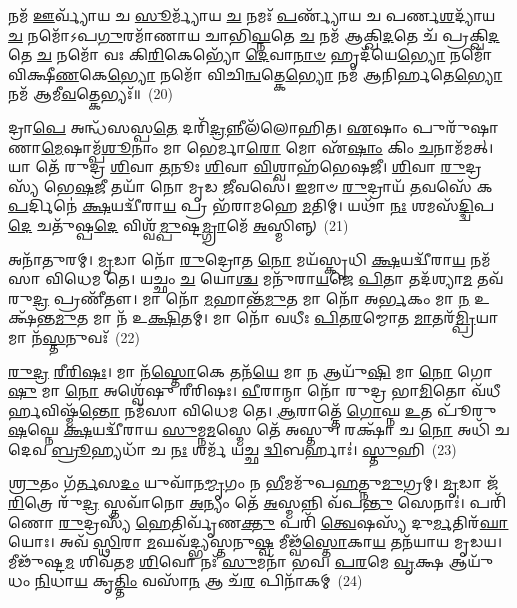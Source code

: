 𑌨𑌮᳴ \ul{𑌊}\-𑌰𑍍𑌵𑍍𑌯𑌾᳴𑌯 𑌚 \ul{𑌸𑍂}\-𑌰𑍍𑌮𑍍𑌯𑌾᳴𑌯 \ul{𑌚} 𑌨𑌮𑌃᳴ \ul{𑌪}\-𑌰𑍍𑌣𑍍𑌯𑌾᳴𑌯 𑌚 𑌪𑌰𑍍𑌣\-\ul{𑌶}\-𑌦𑍍𑌯𑌾᳴𑌯 \ul{𑌚} 𑌨𑌮𑍋᳴\-𑌽𑌪\-\ul{𑌗𑍁}\-𑌰𑌮𑌾᳴𑌣𑌾𑌯 𑌚𑌾𑌭𑌿\-\ul{𑌘𑍍𑌨}\-𑌤𑍇 \ul{𑌚} 𑌨𑌮᳴ 𑌆𑌕𑍍𑌖𑌿\-\ul{𑌦}\-𑌤𑍇 𑌚᳴ 𑌪𑍍𑌰𑌕𑍍𑌖𑌿\-\ul{𑌦}\-𑌤𑍇 \ul{𑌚} 𑌨𑌮𑍋᳴ 𑌵𑌃 𑌕𑌿\-\ul{𑌰𑌿}\-𑌕𑍇𑌭𑍍𑌯𑍋᳴ \ul{𑌦𑍇}\-𑌵𑌾\-\ul{𑌨𑌾}\-\-\ul{𑍞} 𑌹𑍃𑌦᳴𑌯𑍇\-\ul{𑌭𑍍𑌯𑍋} 𑌨𑌮𑍋᳴ 𑌵𑌿𑌕𑍍𑌷𑍀\-\ul{𑌣}\-𑌕𑍇\-\ul{𑌭𑍍𑌯𑍋} 𑌨𑌮𑍋᳴ 𑌵𑌿𑌚𑌿\-\ul{𑌨𑍍𑌵}\-𑌤𑍍𑌕𑍇\-\ul{𑌭𑍍𑌯𑍋} 𑌨𑌮᳴ 𑌆𑌨𑌿𑌰𑍍\mbox{}\-\ul{𑌹}\-𑌤𑍇\-\ul{𑌭𑍍𑌯𑍋} 𑌨𑌮᳴ 𑌆𑌮𑍀\-\ul{𑌵}\-𑌤𑍍𑌕𑍇𑌭𑍍𑌯𑌃᳴॥~(20)

{\anuvakamend[{\-\ul{𑌉}\-\-\ul{𑌲}\-𑌪𑍍𑌯𑌾᳴𑌯 \ul{𑌚} 𑌤𑍍𑌰𑌯᳴𑌸𑍍𑌤𑍍𑌰𑌿𑍞𑌶𑌚𑍍𑌚}]}%

𑌦𑍍𑌰𑌾\-\ul{𑌪𑍇} 𑌅𑌨𑍍𑌧᳴𑌸𑌸𑍍𑌪\-\ul{𑌤𑍇} 𑌦𑌰𑌿᳴\-\ul{𑌦𑍍𑌰}\-𑌨𑍍𑌨𑍀𑌲᳴𑌲𑍋𑌹𑌿𑌤। \ul{𑌏}\-𑌷𑌾𑌂 𑌪𑍁𑌰𑍁᳴𑌷𑌾𑌣𑌾\-\ul{𑌮𑍇}\-𑌷𑌾𑌮𑍍𑌪᳴\-\ul{𑌶𑍂}\-𑌨𑌾𑌂 𑌮𑌾 𑌭𑍇𑌰𑍍𑌮𑌾\-\ul{𑌰𑍋} 𑌮𑍋 𑌏᳴\-\ul{𑌷𑌾𑌂} 𑌕𑌿𑌂 \ul{𑌚}\-𑌨𑌾𑌮᳴𑌮𑌤𑍍। 𑌯𑌾 𑌤𑍇᳴ 𑌰𑍁𑌦𑍍𑌰 \ul{𑌶𑌿}\-𑌵𑌾 \ul{𑌤}\-𑌨𑍂𑌃 \ul{𑌶𑌿}\-𑌵𑌾 \ul{𑌵𑌿}\-𑌶𑍍𑌵𑌾𑌹᳴𑌭𑍇𑌷𑌜𑍀। \ul{𑌶𑌿}\-𑌵𑌾 \ul{𑌰𑍁}\-𑌦𑍍𑌰𑌸𑍍𑌯᳴ 𑌭𑍇\-\ul{𑌷}\-𑌜𑍀 𑌤𑌯𑌾᳴ 𑌨𑍋 𑌮𑍃𑌡 \ul{𑌜𑍀}\-𑌵𑌸𑍇॑। \ul{𑌇}\-𑌮𑌾𑍞 \ul{𑌰𑍁}\-𑌦𑍍𑌰𑌾𑌯᳴ \ul{𑌤}\-𑌵𑌸𑍇᳴ 𑌕\-\ul{𑌪}\-𑌰𑍍𑌦𑌿𑌨𑍇॑ \ul{𑌕𑍍𑌷}\-𑌯𑌦𑍍𑌵𑍀᳴𑌰𑌾\-\ul{𑌯} 𑌪𑍍𑌰 𑌭᳴𑌰𑌾𑌮𑌹𑍇 \ul{𑌮}\-𑌤𑌿𑌮𑍍। 𑌯𑌥𑌾᳴ \ul{𑌨𑌃} 𑌶𑌮𑌸᳴\-\ul{𑌦𑍍𑌦𑍍𑌵𑌿}\-𑌪\-\ul{𑌦𑍇} 𑌚𑌤𑍁᳴𑌷𑍍𑌪\-\ul{𑌦𑍇} 𑌵𑌿𑌶𑍍𑌵᳴\-\ul{𑌮𑍍𑌪𑍁}\-𑌷𑍍𑌟\-\ul{𑌮𑍍𑌗𑍍𑌰𑌾}\-𑌮𑍇᳴ \ul{𑌅}\-𑌸𑍍𑌮𑌿𑌨𑍍𑌨𑍍~(21)

𑌅𑌨𑌾᳴𑌤𑍁𑌰𑌮𑍍। \ul{𑌮𑍃}\-𑌡𑌾 𑌨𑍋᳴ \ul{𑌰𑍁}\-𑌦𑍍𑌰𑍋𑌤 \ul{𑌨𑍋} 𑌮𑌯᳴𑌸𑍍𑌕𑍃𑌧𑌿 \ul{𑌕𑍍𑌷}\-𑌯𑌦𑍍𑌵𑍀᳴𑌰𑌾\-\ul{𑌯} 𑌨𑌮᳴𑌸𑌾 𑌵𑌿𑌧𑍇𑌮 𑌤𑍇। 𑌯𑌚𑍍𑌛𑌂 \ul{𑌚} 𑌯𑍋\-\ul{𑌶𑍍𑌚} 𑌮𑌨𑍁᳴𑌰𑌾\-\ul{𑌯}\-𑌜𑍇 \ul{𑌪𑌿}\-𑌤𑌾 𑌤𑌦᳴𑌶𑍍𑌯𑌾\-\ul{𑌮} 𑌤𑌵᳴ 𑌰𑍁\-\ul{𑌦𑍍𑌰} 𑌪𑍍𑌰𑌣𑍀᳴𑌤𑍗। 𑌮𑌾 𑌨𑍋᳴ \ul{𑌮}\-𑌹𑌾𑌨𑍍𑌤᳴\-\ul{𑌮𑍁}\-𑌤 𑌮𑌾 𑌨𑍋᳴ 𑌅\-\ul{𑌰𑍍𑌭}\-𑌕𑌂 𑌮𑌾 \ul{𑌨} 𑌉𑌕𑍍𑌷᳴𑌨𑍍𑌤\-\ul{𑌮𑍁}\-𑌤 𑌮𑌾 𑌨᳴ 𑌉\-\ul{𑌕𑍍𑌷𑌿}\-𑌤𑌮𑍍। 𑌮𑌾 𑌨𑍋᳴ 𑌵𑌧𑍀𑌃 \ul{𑌪𑌿}\-𑌤\-\ul{𑌰}\-𑌮𑍍𑌮𑍋𑌤 \ul{𑌮𑌾}\-𑌤𑌰᳴\-\ul{𑌮𑍍𑌪𑍍𑌰𑌿}\-𑌯𑌾 𑌮𑌾 𑌨᳴\-\ul{𑌸𑍍𑌤}\-𑌨𑍁𑌵𑌃᳴~(22)

\-\ul{𑌰𑍁}\-\-\ul{𑌦𑍍𑌰} \ul{𑌰𑍀}\-\-\ul{𑌰𑌿}\-\-\ul{𑌷𑌃}\-। 𑌮𑌾 𑌨᳴\-\ul{𑌸𑍍𑌤𑍋}\-𑌕𑍇 𑌤𑌨᳴\-\ul{𑌯𑍇} 𑌮𑌾 \ul{𑌨} 𑌆𑌯𑍁᳴\-\ul{𑌷𑌿} 𑌮𑌾 \ul{𑌨𑍋} 𑌗𑍋\-\ul{𑌷𑍁} 𑌮𑌾 \ul{𑌨𑍋} 𑌅𑌶𑍍𑌵𑍇᳴𑌷𑍁 𑌰𑍀𑌰𑌿𑌷𑌃। \ul{𑌵𑍀}\-𑌰𑌾𑌨𑍍𑌮𑌾 𑌨𑍋᳴ 𑌰𑍁𑌦𑍍𑌰 𑌭𑌾\-\ul{𑌮𑌿}\-𑌤𑍋 𑌵᳴𑌧𑍀𑌰𑍍\mbox{}\-\ul{𑌹}\-𑌵𑌿𑌷𑍍𑌮᳴\-\ul{𑌨𑍍𑌤𑍋} 𑌨𑌮᳴𑌸𑌾 𑌵𑌿𑌧𑍇𑌮 𑌤𑍇। \ul{𑌆}\-𑌰𑌾𑌤𑍍𑌤𑍇᳴ \ul{𑌗𑍋}\-𑌘𑍍𑌨 \ul{𑌉}\-𑌤 𑌪𑍂᳴𑌰𑍁\-\ul{𑌷}\-𑌘𑍍𑌨𑍇 \ul{𑌕𑍍𑌷}\-𑌯𑌦𑍍𑌵𑍀᳴𑌰𑌾𑌯 \ul{𑌸𑍁}\-𑌮𑍍𑌨\-\ul{𑌮}\-𑌸𑍍𑌮𑍇 𑌤𑍇᳴ 𑌅𑌸𑍍𑌤𑍁। 𑌰𑌕𑍍𑌷𑌾᳴ 𑌚 \ul{𑌨𑍋} 𑌅𑌧𑌿᳴ 𑌚 𑌦𑍇𑌵 \ul{𑌬𑍍𑌰𑍂}\-𑌹𑍍𑌯𑌧𑌾᳴ 𑌚 \ul{𑌨𑌃} 𑌶𑌰𑍍𑌮᳴ 𑌯𑌚𑍍𑌛 \ul{𑌦𑍍𑌵𑌿}\-𑌬𑌰𑍍\mbox{}𑌹𑌾𑌃॑। \ul{𑌸𑍍𑌤𑍁}\-𑌹𑌿~(23)

\-\ul{𑌶𑍍𑌰𑍁}\-𑌤𑌂 𑌗᳴\-\ul{𑌰𑍍𑌤}\-𑌸\-\ul{𑌦𑌂} 𑌯𑍁𑌵𑌾᳴𑌨\-\ul{𑌮𑍍𑌮𑍃}\-𑌗𑌂 𑌨 \ul{𑌭𑍀}\-𑌮𑌮𑍁᳴𑌪\-\ul{𑌹}\-𑌤𑍍𑌨𑍁\-\ul{𑌮𑍁}\-𑌗𑍍𑌰𑌮𑍍। \ul{𑌮𑍃}\-𑌡𑌾 𑌜᳴\-\ul{𑌰𑌿}\-𑌤𑍍𑌰𑍇 𑌰𑍁᳴\-\ul{𑌦𑍍𑌰} 𑌸𑍍𑌤𑌵𑌾᳴𑌨𑍋 \ul{𑌅}\-𑌨𑍍𑌯𑌂 𑌤𑍇᳴ \ul{𑌅}\-𑌸𑍍𑌮𑌨𑍍𑌨𑌿 𑌵᳴𑌪\-\ul{𑌨𑍍𑌤𑍁} 𑌸𑍇𑌨𑌾𑌃॑। 𑌪𑌰𑌿᳴ 𑌣𑍋 \ul{𑌰𑍁}\-𑌦𑍍𑌰𑌸𑍍𑌯᳴ \ul{𑌹𑍇}\-𑌤𑌿𑌰𑍍𑌵𑍃᳴𑌣\-\ul{𑌕𑍍𑌤𑍁} 𑌪𑌰𑌿᳴ \ul{𑌤𑍍𑌵𑍇}\-𑌷𑌸𑍍𑌯᳴ 𑌦𑍁\-\ul{𑌰𑍍𑌮}\-𑌤𑌿𑌰᳴\-\ul{𑌘𑌾}\-𑌯𑍋𑌃। 𑌅𑌵᳴ \ul{𑌸𑍍𑌥𑌿}\-𑌰𑌾 \ul{𑌮}\-𑌘𑌵᳴𑌦𑍍𑌭𑍍𑌯𑌸𑍍𑌤𑌨𑍁\-\ul{𑌷𑍍𑌵} 𑌮𑍀𑌢𑍍𑌵᳴\-\ul{𑌸𑍍𑌤𑍋}\-𑌕𑌾\-\ul{𑌯} 𑌤𑌨᳴𑌯𑌾𑌯 𑌮𑍃𑌡𑌯। 𑌮𑍀𑌢𑍁᳴𑌷𑍍𑌟\-\ul{𑌮} 𑌶𑌿𑌵᳴𑌤𑌮 \ul{𑌶𑌿}\-𑌵𑍋 𑌨𑌃᳴ \ul{𑌸𑍁}\-𑌮𑌨𑌾᳴ 𑌭𑌵। \ul{𑌪}\-\-\ul{𑌰}\-𑌮𑍇 \ul{𑌵𑍃}\-𑌕𑍍𑌷 𑌆𑌯𑍁᳴𑌧𑌂 \ul{𑌨𑌿}\-𑌧𑌾\-\ul{𑌯} 𑌕𑍃\-\ul{𑌤𑍍𑌤𑌿𑌂} 𑌵𑌸𑌾᳴\-\ul{𑌨} 𑌆 𑌚᳴\-\ul{𑌰} 𑌪𑌿𑌨𑌾᳴𑌕𑌮𑍍~(24)

